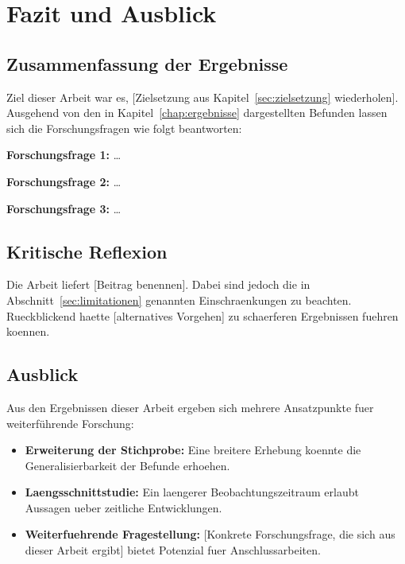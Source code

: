 
\chapter{Fazit und Ausblick}
\label{chap:fazit}

\section{Zusammenfassung der Ergebnisse}
\label{sec:zusammenfassung}

Ziel dieser Arbeit war es, [Zielsetzung aus Kapitel~\ref{sec:zielsetzung}
wiederholen]. Ausgehend von den in Kapitel~\ref{chap:ergebnisse} dargestellten
Befunden lassen sich die Forschungsfragen wie folgt beantworten:

\textbf{Forschungsfrage 1:} \ldots

\textbf{Forschungsfrage 2:} \ldots

\textbf{Forschungsfrage 3:} \ldots

\section{Kritische Reflexion}
\label{sec:reflexion}

Die Arbeit liefert [Beitrag benennen]. Dabei sind jedoch die in
Abschnitt~\ref{sec:limitationen} genannten Einschraenkungen zu beachten.
Rueckblickend haette [alternatives Vorgehen] zu schaerferen Ergebnissen
fuehren koennen.

\section{Ausblick}
\label{sec:ausblick}

Aus den Ergebnissen dieser Arbeit ergeben sich mehrere Ansatzpunkte fuer
weiterführende Forschung:

\begin{itemize}
  \item \textbf{Erweiterung der Stichprobe:} Eine breitere Erhebung koennte
        die Generalisierbarkeit der Befunde erhoehen.
  \item \textbf{Laengsschnittstudie:} Ein laengerer Beobachtungszeitraum
        erlaubt Aussagen ueber zeitliche Entwicklungen.
  \item \textbf{Weiterfuehrende Fragestellung:} [Konkrete Forschungsfrage,
        die sich aus dieser Arbeit ergibt] bietet Potenzial fuer
        Anschlussarbeiten.
\end{itemize}
